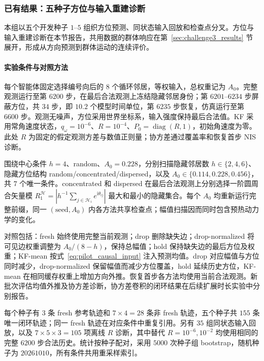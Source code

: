 \documentclass[UTF8,fontset=windows,11pt]{ctexart}
\begin{document}
\subsubsection{已有结果：五种子方位与输入重建诊断}
\label{sec:kf_pilot}

本组以五个开发种子 $1$--$5$ 组织方位预测、同状态输入回放和检查点分叉。方位与输入重建诊断在本节报告，共用数据的群体响应在第~\ref{sec:challenge3_results} 节展开，形成从方向预测到群体运动的连续评价。

\paragraph{实验条件与对照方法}

每个智能体固定选择编号向后的 $8$ 个循环邻居，等权输入，总权重记为 $A_0$。完整观测运行至第 $6200$ 步，在最后合法观测上冻结隐藏邻居身份；第 $6201$--$6234$ 步屏蔽方位，共 $34$ 步，即 $10.2$ 个模型时间单位，第 $6235$ 步恢复，仿真运行至第 $6600$ 步。观测无噪声，方位采用世界坐标系，输入强度保持最后合法值。KF 采用常角速度状态，$q_\omega=10^{-6}$、$R=10^{-4}$、$P_0=\operatorname{diag}(R,1)$，初始角速度为零。此处 $R$ 为固定的假定观测方差与数值正则量；协方差通过覆盖率和恢复首步 NIS 诊断。

围绕中心条件 $h=4$、random、$A_0=0.228$，分别扫描隐藏邻居数 $h\in\{2,4,6\}$、隐藏方位结构 random/concentrated/dispersed，以及 $A_0\in\{0.114,0.228,0.456\}$，共 $7$ 个唯一条件。concentrated 和 dispersed 在最后合法观测上分别选择一阶圆周合矢量模 $R_1^{\mathcal H}=|h^{-1}\sum_{j\in\mathcal H_i}e^{\mathrm{i}\theta_{ij}}|$ 最大和最小的隐藏集合。每个 $A_0$ 均重新运行完整前缀，同一 $(\text{seed},A_0)$ 内各方法共享检查点；幅值扫描因而同时包含预热动力学的变化。

对照包括：fresh 始终使用完整当前观测；drop 删除缺失边；drop-normalized 将可见边权重调整为 $A_0/(8-h)$，保持总幅值；hold 保持缺失边的最后方位及权重；KF-mean 按式~\eqref{eq:pilot_causal_input} 注入预测均值。drop 对应幅值与方位同时减少，drop-normalized 保留幅值而减少方位覆盖，hold 延续历史方位，KF-mean 在相同缓存权重上增加方向外推。恢复首步各方法均使用当前合法观测。新批次评估均值外推及协方差诊断，协方差卷积的闭环结果在后续扩展时长实验中分别报告。

每个种子有 $3$ 条 fresh 参考轨迹和 $7\times4=28$ 条非 fresh 轨迹，五个种子共 $155$ 条唯一闭环轨迹；同一 fresh 轨迹在对应条件中重复引用。另有 $35$ 组同状态输入回放，以及 $7\times5\times3=105$ 项离线 $R$ 诊断，其中替代 $R=10^{-6},10^{-2}$ 均使用相同的完整 $6200$ 步合法历史。统计按种子配对，采用 $5000$ 次种子组 bootstrap，随机种子为 $20261010$，所有条件共用重采样索引。
\end{document}
